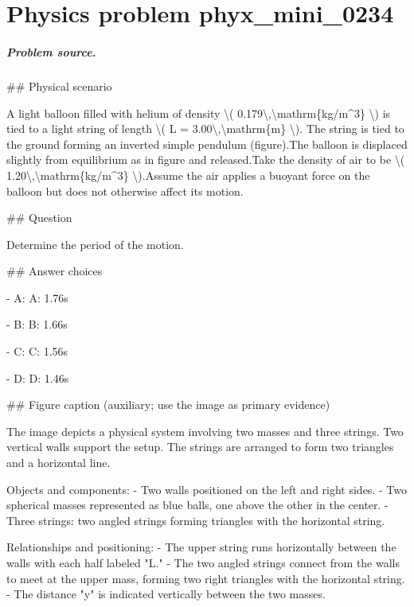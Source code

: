
\chapter{Physics problem phyx\_mini\_0234}
\label{ch:PhyXMiniProblems_problem_phyx_mini_0234}

\paragraph{Problem source.}
\#\# Physical scenario

A light balloon filled with helium of density \textbackslash{}( 0.179\textbackslash{},\textbackslash{}mathrm\{kg/m\textasciicircum{}3\} \textbackslash{}) is tied to a light string of length \textbackslash{}( L = 3.00\textbackslash{},\textbackslash{}mathrm\{m\} \textbackslash{}). The string is tied to the ground forming an inverted simple pendulum (figure).The balloon is displaced slightly from equilibrium as in figure and released.Take the density of air to be \textbackslash{}( 1.20\textbackslash{},\textbackslash{}mathrm\{kg/m\textasciicircum{}3\} \textbackslash{}).Assume the air applies a buoyant force on the balloon but does not otherwise affect its motion.

\#\# Question

Determine the period of the motion.

\#\# Answer choices

- A: A: 1.76s

- B: B: 1.66s

- C: C: 1.56s

- D: D: 1.46s

\#\# Figure caption (auxiliary; use the image as primary evidence)

The image depicts a physical system involving two masses and three strings. Two vertical walls support the setup. The strings are arranged to form two triangles and a horizontal line. 

Objects and components:
- Two walls positioned on the left and right sides.
- Two spherical masses represented as blue balls, one above the other in the center.
- Three strings: two angled strings forming triangles with the horizontal string.

Relationships and positioning:
- The upper string runs horizontally between the walls with each half labeled "L."
- The two angled strings connect from the walls to meet at the upper mass, forming two right triangles with the horizontal string.
- The distance "y" is indicated vertically between the two masses.

